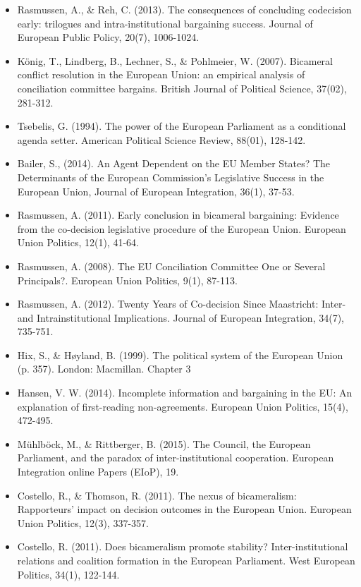 \begin{itemize}
	\item Rasmussen, A., \& Reh, C. (2013). The consequences of concluding codecision early: trilogues and intra-institutional bargaining success. Journal of European Public Policy, 20(7), 1006-1024.
	\item K{\"o}nig, T., Lindberg, B., Lechner, S., \& Pohlmeier, W. (2007). Bicameral conflict resolution in the European Union: an empirical analysis of conciliation committee bargains. British Journal of Political Science, 37(02), 281-312.
	\item Tsebelis, G. (1994). The power of the European Parliament as a conditional agenda setter. American Political Science Review, 88(01), 128-142.
	\item Bailer, S., (2014). An Agent Dependent on the EU Member States? The Determinants of the European Commission’s Legislative Success in the European Union, Journal of European Integration, 36(1), 37-53.
	\item Rasmussen, A. (2011). Early conclusion in bicameral bargaining: Evidence from the co-decision legislative procedure of the European Union. European Union Politics, 12(1), 41-64.
	\item Rasmussen, A. (2008). The EU Conciliation Committee One or Several Principals?. European Union Politics, 9(1), 87-113.
	\item Rasmussen, A. (2012). Twenty Years of Co-decision Since Maastricht: Inter-and Intrainstitutional Implications. Journal of European Integration, 34(7), 735-751.
	\item Hix, S., \& H{\o}yland, B. (1999). The political system of the European Union (p. 357). London: Macmillan. Chapter 3
	\item Hansen, V. W. (2014). Incomplete information and bargaining in the EU: An explanation of first-reading non-agreements. European Union Politics, 15(4), 472-495.
	\item M{\"u}hlb{\"o}ck, M., \& Rittberger, B. (2015). The Council, the European Parliament, and the paradox of inter-institutional cooperation. European Integration online Papers (EIoP), 19.
	\item Costello, R., \& Thomson, R. (2011). The nexus of bicameralism: Rapporteurs’ impact on decision outcomes in the European Union. European Union Politics, 12(3), 337-357.
	\item Costello, R. (2011). Does bicameralism promote stability? Inter-institutional relations and coalition formation in the European Parliament. West European Politics, 34(1), 122-144.

\end{itemize}
